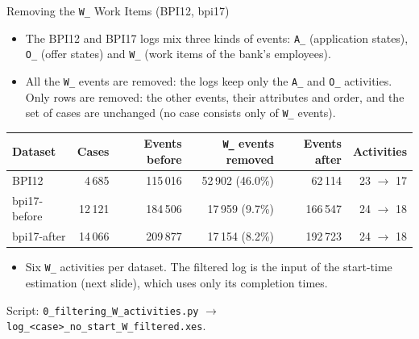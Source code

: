 \documentclass[aspectratio=169]{beamer} %
\begin{document}
\begin{frame}{Removing the \texttt{W\_} Work Items (BPI12, bpi17)}
  \small
  \begin{itemize}
    \item The BPI12 and BPI17 logs mix three kinds of events: \texttt{A\_} (application
      states), \texttt{O\_} (offer states) and \texttt{W\_} (work items of the bank's employees).
    \item All the \texttt{W\_} events are \alert{removed}: the logs keep only the
      \texttt{A\_} and \texttt{O\_} activities. Only rows are removed: the other events, their
      attributes and order, and the set of cases are unchanged (no case consists only of
      \texttt{W\_} events).
  \end{itemize}
  \begin{center}\setlength{\tabcolsep}{5pt}
  \begin{tabular}{lrrrrr}
    \toprule
    Dataset & Cases & Events before & \texttt{W\_} events removed & Events after & Activities \\
    \midrule
    BPI12        &  4\,685 & 115\,016 & 52\,902 (46.0\%) &  62\,114 & 23 $\rightarrow$ 17 \\
    bpi17-before & 12\,121 & 184\,506 & 17\,959 (9.7\%)  & 166\,547 & 24 $\rightarrow$ 18 \\
    bpi17-after  & 14\,066 & 209\,877 & 17\,154 (8.2\%)  & 192\,723 & 24 $\rightarrow$ 18 \\
    \bottomrule
  \end{tabular}
  \end{center}
  \begin{itemize}
    \item Six \texttt{W\_} activities per dataset. The filtered log is the input of the
      start-time estimation (next slide), which uses only its completion times.
  \end{itemize}
  {\scriptsize Script: \texttt{0\_filtering\_W\_activities.py} $\rightarrow$ \texttt{log\_<case>\_no\_start\_W\_filtered.xes}.}
\end{frame}
\end{document}
